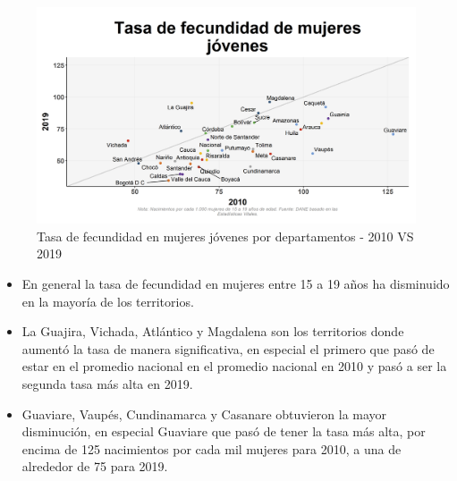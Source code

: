     \begin{figure}[H]
        \caption{Tasa de fecundidad en mujeres jóvenes por departamentos - 2010 VS 2019 \label{map_result_2} }
        \begin{center}
        \includegraphics[width=\textwidth,keepaspectratio]{img/var_282_scatter_time.png}
        \end{center}
    \end{figure}
            \begin{itemize}
                \item En general la tasa de fecundidad en mujeres entre 15 a 19 años ha disminuido en la mayoría de los territorios.
                \item La Guajira, Vichada, Atlántico y Magdalena son los territorios donde aumentó la tasa de manera significativa, en especial el primero que pasó de estar en el promedio nacional en el promedio nacional en 2010 y pasó a ser la segunda tasa más alta en 2019.
                \item Guaviare, Vaupés, Cundinamarca y Casanare obtuvieron la mayor disminución, en especial Guaviare que pasó de tener la tasa más alta, por encima de 125 nacimientos por cada mil mujeres para 2010, a una de alrededor de 75 para 2019.
                \end{itemize}

